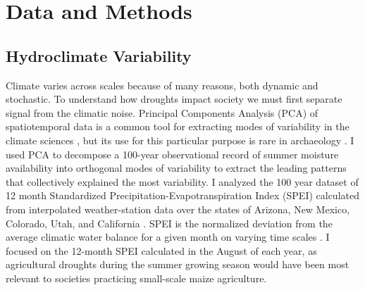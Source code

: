\documentclass[10pt]{iopart}
\begin{document}

\section*{Data and Methods}

\subsection*{Hydroclimate Variability}

Climate varies across scales because of many reasons, both dynamic and stochastic. To understand how droughts impact society we must first separate signal from the climatic noise. Principal Components Analysis (PCA) of spatiotemporal data is a common tool for extracting modes of variability in the climate sciences \parencite{Lorenz1956,Hannachi2007}, but its use for this particular purpose is rare in archaeology \parencite{Weiss1982, Cordell2007}. I used PCA to decompose a 100-year observational record of summer moisture availability into orthogonal modes of variability to extract the leading patterns that collectively explained the most variability. I analyzed the 100 year dataset of 12 month Standardized Precipitation-Evapotranspiration Index (SPEI) calculated from interpolated weather-station data over the states of Arizona, New Mexico, Colorado, Utah, and California \parencite{Daly1997}. SPEI is the normalized deviation from the average climatic water balance for a given month on varying time scales \parencite{Vicente-Serrano2010}. I focused on the 12-month SPEI calculated in the August of each year, as agricultural droughts during the summer growing season would have been most relevant to societies practicing small-scale maize agriculture.
\end{document}
